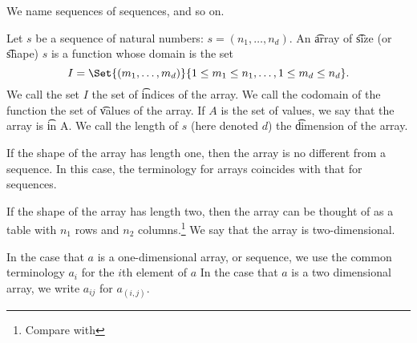 

We name sequences of sequences, and so on.


Let $s$ be a sequence of natural numbers: $s = (n_1, \dots, n_d)$.
An \t{array} of \t{size} (or \t{shape}) $s$ is a function whose domain is the set
\[
  I = \Set{(m_1, \dots, m_d)}{ 1 \leq m_1 \leq n_1, \dots, 1 \leq m_d \leq n_d}.
\]
We call the set $I$ the set of \t{indices} of the array.
We call the codomain of the function the set of \t{values} of the array.
If $A$ is the set of values, we say that the array is \t{in} A.
We call the length of $s$ (here denoted $d$) the \t{dimension} of the array.


If the shape of the array has length one, then the array is no different from a sequence.
In this case, the terminology for arrays coincides with that for sequences.


If the shape of the array has length two, then the array can be thought of as a table with $n_1$ rows and $n_2$ columns.\footnote{Compare with }
We say that the array is two-dimensional.


In the case that $a$ is a one-dimensional array, or sequence, we use the common terminology $a_i$ for the $i$th element of $a$
In the case that $a$ is a two dimensional array, we write $a_{ij}$ for $a_{(i,j)}$.
